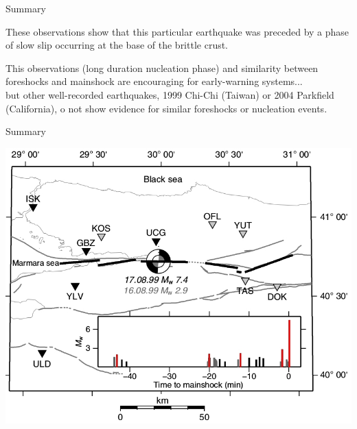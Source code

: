 \documentclass[aspectratio=43,9pt]{beamer}
\begin{document}
\begin{frame}{Summary}
 
 These observations show that this particular earthquake 
 was preceded by a phase of slow slip occurring at the 
 base of the brittle crust. \\
 \vskip 0.2cm

 This observations (long duration nucleation phase)
 and similarity between foreshocks and mainshock are encouraging
 for early-warning systems... \\
 \vskip 0.2cm
 but
 \vskip 0.2cm
 other well-recorded earthquakes, 1999 Chi-Chi (Taiwan) or 
 2004 Parkfield (California), o not show evidence for similar 
 foreshocks or nucleation events.
 \vfill
\end{frame}


\begin{frame}{Summary}
 
 \includegraphics{Figs/fig_1ells.jpg}
 
\end{frame}
\end{document}
